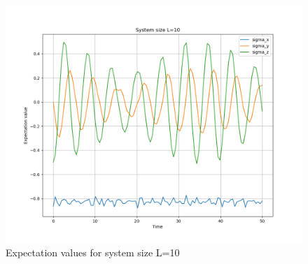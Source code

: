 \documentclass[12pt]{article}
\begin{document}
\begin{figure}
    \centering
    \includegraphics[width=\textwidth]{Expectation_values_L_10.png}
    \caption{Expectation values for system size L=10}
\end{figure}
\end{document}
